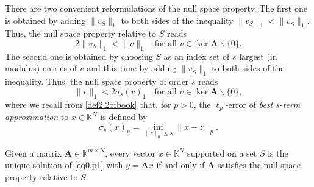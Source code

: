 \begin{remark}
    \label{rmk0.4.3}
    There are two convenient reformulations of the null space property. The first one is obtained by adding $\|v_S\|_1$ to both sides of the inequality $\|v_S\|_1 < \|v_{\bar{S}}\|_1$. Thus, the null space property relative to $S$ reads 
    \begin{equation}
        2\|v_S\|_1 < \|v\|_1 \quad \text{for all } v \in \mathop{\mathrm{ker}} \mathbf{A} \backslash \{0\}.
        \label{eq0.4.2}
    \end{equation}
    The second one is obtained by choosing $S$ as an index set of $s$ largest (in modulus) entries of $v$ and this time by adding $\|v_{\bar{S}}\|_1$ to both sides of the inequality. Thus, the null space property of order $s$ reads
    \begin{equation}
        \|v\|_1 < 2 \sigma_s(v)_1 \quad \text{for all } v \in \mathop{\mathrm{ker}}\mathbf{A} \backslash \{0\},
        \label{eq0.4.3}
    \end{equation}
    where we recall from \cref{def2.2ofbook} that, for $p>0$, the $\ell_p$-error of \textcolor[rgb]{1,0,0}{\emph{best $s$-term approximation}} to $x \in \mathbb{K}^N$ is defined by 
    \[
        \sigma_s(x)_p = \inf\limits_{\|z\|_0 \leq s} \|x-z\|_p.
    \]
\end{remark}

\begin{theorem}
    \label{th0.4.4}
    Given a matrix $\mathbf{A} \in \mathbb{K}^{m \times N}$, every vector $x \in \mathbb{K}^N$ supported on a set $S$ is the unique solution of \cref{eq0.p1} with $y = \mathbf{A}x$ if and only if $\mathbf{A}$ satisfies the null space property relative to $S$.
\end{theorem}

